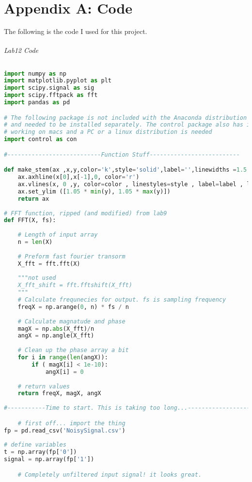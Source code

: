 \documentclass[12pt,a4paper]{article}
\begin{document}
\section{Appendix A: Code}
The following is the code I used for this project.\\
\\
\textit{Lab12 Code}
\begin{lstlisting}[language=Python]

import numpy as np
import matplotlib.pyplot as plt
import scipy.signal as sig
import scipy.fftpack as fft
import pandas as pd

# The following package is not included with the Anaconda distribution
# and needed to be installed separately. The control package also has issues
# working on macs and a PC or a linux distribution is needed
import control as con

#---------------------------Function Stuff--------------------------

def make_stem(ax ,x,y,color='k',style='solid',label='',linewidths =1.5 ,** kwargs):
    ax.axhline(x[0],x[-1],0, color='r')
    ax.vlines(x, 0 ,y, color=color , linestyles=style , label=label , linewidths= linewidths)
    ax.set_ylim ([1.05 * min(y), 1.05 * max(y)])
    return ax
    
# FFT function, ripped (and modified) from lab9
def FFT(X, fs):
    
    # Length of input array
    n = len(X)
    
    # Preform fast fourier transorm
    X_fft = fft.fft(X)
        
    """not used
    X_fft_shift = fft.fftshift(X_fft)
    """
    # Calculate frequnecies for output. fs is sampling frequency
    freqX = np.arange(0, n) * fs / n
    
    # Calculate magnatude and phase
    magX = np.abs(X_fft)/n
    angX = np.angle(X_fft)
    
    # Clean up the phase array a bit
    for i in range(len(angX)):
        if ( magX[i] < 1e-10):
            angX[i] = 0
    
    # return values
    return freqX, magX, angX
    
#-----------Time to start. This is taking too long...------------------------

    # first off... import the thing
fp = pd.read_csv('NoisySignal.csv')
    
# define variables
t = np.array(fp['0'])
signal = np.array(fp['1'])

    # Completely unfiltered input signal! it looks great. 


\end{lstlisting}
\end{document}
